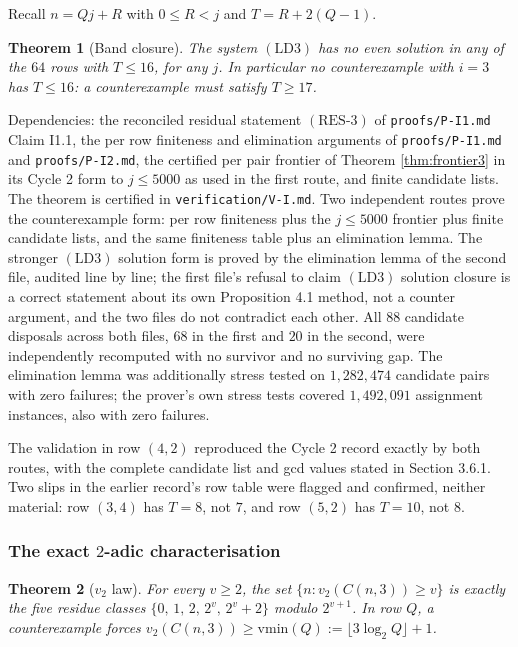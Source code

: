 \documentclass[11pt]{article}
\newtheorem{theorem}{Theorem}[section]
\theoremstyle{remark}
\newcommand{\LDthree}{\ensuremath{\mathrm{(LD3)}}}
\newcommand{\RESthree}{\ensuremath{\mathrm{(RES\text{-}3)}}}
\begin{document}
Recall $n=Qj+R$ with $0\le R<j$ and $T=R+2(Q-1)$.

\begin{theorem}[Band closure]
\label{thm:band}
The system \LDthree{} has no even solution in any of the $64$ rows with $T\le 16$, for any $j$. In particular no counterexample with $i=3$ has $T\le 16$: a counterexample must satisfy $T\ge 17$.
\end{theorem}

Dependencies: the reconciled residual statement \RESthree{} of \texttt{proofs/P-I1.md} Claim I1.1, the per row finiteness and elimination arguments of \texttt{proofs/P-I1.md} and \texttt{proofs/P-I2.md}, the certified per pair frontier of Theorem \ref{thm:frontier3} in its Cycle 2 form to $j\le 5000$ as used in the first route, and finite candidate lists. The theorem is certified in \texttt{verification/V-I.md}. Two independent routes prove the counterexample form: per row finiteness plus the $j\le 5000$ frontier plus finite candidate lists, and the same finiteness table plus an elimination lemma. The stronger \LDthree{} solution form is proved by the elimination lemma of the second file, audited line by line; the first file's refusal to claim \LDthree{} solution closure is a correct statement about its own Proposition 4.1 method, not a counter argument, and the two files do not contradict each other. All $88$ candidate disposals across both files, $68$ in the first and $20$ in the second, were independently recomputed with no survivor and no surviving gap. The elimination lemma was additionally stress tested on $1{,}282{,}474$ candidate pairs with zero failures; the prover's own stress tests covered $1{,}492{,}091$ assignment instances, also with zero failures.

The validation in row $(4,2)$ reproduced the Cycle 2 record exactly by both routes, with the complete candidate list and gcd values stated in Section 3.6.1. Two slips in the earlier record's row table were flagged and confirmed, neither material: row $(3,4)$ has $T=8$, not $7$, and row $(5,2)$ has $T=10$, not $8$.

\subsubsection{The exact $2$-adic characterisation}

\begin{theorem}[$v_2$ law]
\label{thm:v2}
For every $v\ge 2$, the set $\{n : v_2(C(n,3))\ge v\}$ is exactly the five residue classes $\{0,\,1,\,2,\,2^v,\,2^v+2\}$ modulo $2^{v+1}$. In row $Q$, a counterexample forces $v_2(C(n,3))\ge \mathrm{vmin}(Q):=\lfloor 3\log_2 Q\rfloor+1$.
\end{theorem}
\end{document}

